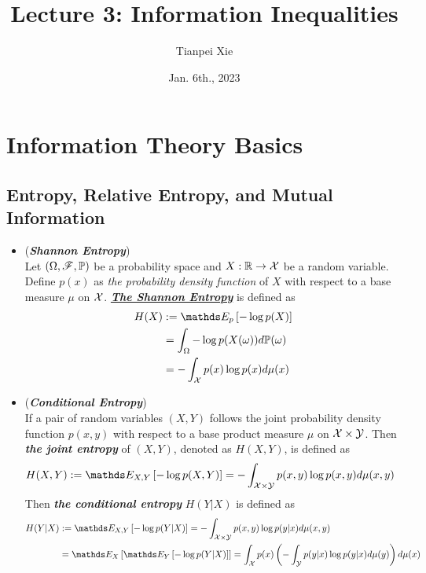 \documentclass[11pt]{article}
\begin{document}
\title{Lecture 3: Information Inequalities}
\author{ Tianpei Xie}
\date{Jan. 6th., 2023 }
\maketitle
\tableofcontents
\newpage
\section{Information Theory Basics}
\subsection{Entropy, Relative Entropy, and Mutual Information}
\begin{itemize}
\item \begin{definition} (\textbf{\emph{Shannon Entropy}}) \citep{thomas2006elements}\\
Let $(\Omega, {\mathscr F}, {\mathbb P})$ be a probability space and $X: {\mathbb R} \to {\mathcal X}$ be a random variable. Define $p(x)$ as \emph{the probability density function} of $X$ with respect to a base measure $\mu$ on ${\mathcal X}$. \underline{\emph{\textbf{The Shannon Entropy}}} is defined as 
\begin{align*}
H(X) &:= \E{p}{-\log p(X)} \\
&= \int_{\Omega} -\log p(X(\omega)) d\bP(\omega) \\
&= - \int_{\cX} p(x)  \log p(x) d\mu(x)
\end{align*}
\end{definition}

\item \begin{definition} (\textbf{\emph{Conditional Entropy}}) \citep{thomas2006elements}\\
If a pair of random variables $(X, Y)$ follows the joint probability density function $p(x, y)$ with respect to a base product measure $\mu$ on ${\mathcal X} \times {\mathcal Y}$. Then \emph{\textbf{the joint entropy}} of $(X, Y)$, denoted as $H(X, Y)$, is defined as
\begin{align*}
H(X, Y) &:=  \E{X, Y}{-\log p(X, Y)} = - \int_{\cX \times \cY} p(x, y)  \log p(x, y) d\mu(x, y)
\end{align*} Then \emph{\textbf{the conditional entropy}} $H(Y | X)$ is defined as
\begin{align*}
H(Y | X) &:= \E{X, Y}{-\log p(Y|X)}  = -\int_{\cX \times \cY} p(x, y)  \log p(y | x) d\mu(x, y) \\
&=  \E{X}{\E{Y}{-\log p(Y|X)}} = \int_{\cX}p(x) \paren{-\int_{\cY}p(y|x) \log p(y|x) d\mu(y)}d\mu(x)
\end{align*}
\end{definition}


\end{itemize}
\end{document}

